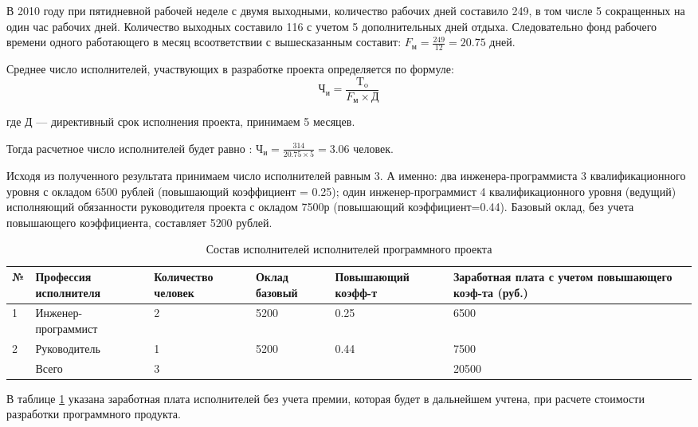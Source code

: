 В 2010 году при пятидневной рабочей неделе с двумя выходными, количество рабочих дней составило 249,
в том числе 5 сокращенных на один час рабочих дней. Количество выходных составило 116 с учетом 5
дополнительных дней отдыха. Следовательно фонд рабочего времени одного работающего в месяц всоответствии
с вышесказанным составит: $F_{\textrm{м}} = \frac{249}{12} = 20.75$ дней.


Среднее число исполнителей, участвующих в разработке проекта определяется по формуле:
\begin{equation}
	\textrm{Ч}_{\textrm{и}} = \frac{\textrm{T}_{\textrm{o}}} {F_{\textrm{м}} \times{} \textrm{Д}}
\end{equation}
\begin{ESKDexplanation}
	\item[где ] Д --- директивный срок исполнения проекта, принимаем 5 месяцев.
\end{ESKDexplanation}
Тогда расчетное число исполнителей будет равно : $\textrm{Ч}_{\textrm{и}} = \frac{314}{20.75 \times{} 5} = 3.06$ человек.

\begin{par}
Исходя из полученного результата принимаем число исполнителей равным 3.
А именно: два инженера-программиста 3 квалификационного уровня с окладом 6500 рублей (повышающий коэффициент = 0.25);
один инженер-программист 4 квалификационного уровня (ведущий) исполняющий обязанности руководителя
проекта с окладом 7500р (повышающий коэффициент=0.44). Базовый оклад, без учета повышающего коэффициента,
составляет 5200 рублей.
\end{par}

\begin{table}[H]
\caption{Состав исполнителей исполнителей программного проекта}
\begin{tabular}{|l|p{3.5cm}|p{2.5cm}|p{2.5cm}|p{3cm}|p{2.5cm}|}
\hline{}
№ & Профессия исполнителя & Количество человек & Оклад базовый & Повышающий  коэфф-т & Заработная плата с учетом повышающего коэф-та (руб.) \\
\hline{}
1 & Инженер-программист & 2 & 5200 & 0.25 & 6500 \\
\hline{}
2 & Руководитель & 1 & 5200 & 0.44 & 7500 \\
\hline{}
& Всего & 3  & & & 20500 \\
\hline
\end{tabular}
\label{table:employeeList}
\end{table}


\begin{par}
В таблице \ref{table:employeeList} указана заработная плата исполнителей без учета
премии, которая будет в дальнейшем учтена, при расчете стоимости разработки
программного продукта.
\end{par}


